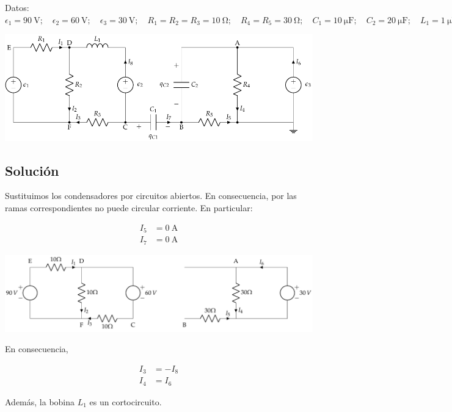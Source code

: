 Datos:
$\epsilon_1=\qty{90}{\volt};\quad \epsilon_2=\qty{60}{\volt};\quad
\epsilon_3=\qty{30}{\volt};\quad R_{1}= R_2 = R_3 =
\qty{10}{\ohm};\quad R_{4}= R_5 = \qty{30}{\ohm};\quad C_{1}=
\qty{10}{\micro\farad};\quad C_{2}= \qty{20}{\micro\farad};\quad L_1 =
\qty{1}{\micro\henry}$

\begin{center}
  \includegraphics[scale = 0.8]{figuras/mallas_carga_inicial.pdf}
\end{center}


\subsection*{Solución}

Sustituimos los condensadores por circuitos abiertos. En consecuencia, por las ramas correspondientes no puede circular corriente. En particular:

\begin{align*}
  I_5 &= \qty{0}{\ampere}\\
  I_7 &= \qty{0}{\ampere}
\end{align*}

\begin{center}
  \includegraphics[width=\linewidth]{figuras/BT1_10_mod.pdf}
\end{center}

En consecuencia,

\begin{align*}
  I_3 &= -I_8\\
  I_4 &= I_6
\end{align*}

Además, la bobina $L_1$ es un cortocircuito.

